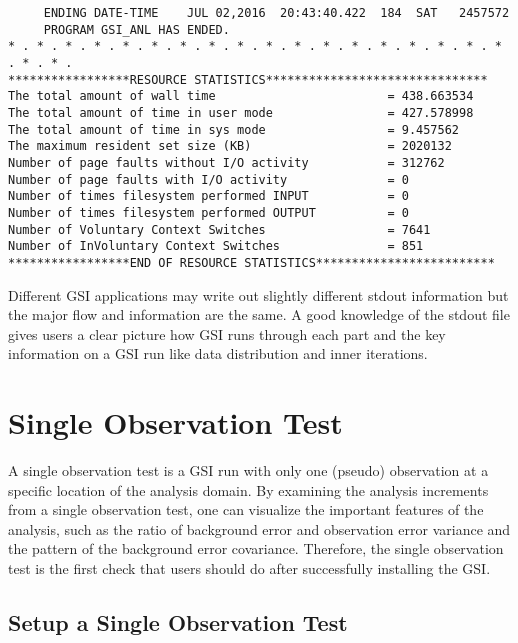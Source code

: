 \begin{scriptsize}
\begin{verbatim}
     ENDING DATE-TIME    JUL 02,2016  20:43:40.422  184  SAT   2457572
     PROGRAM GSI_ANL HAS ENDED.
* . * . * . * . * . * . * . * . * . * . * . * . * . * . * . * . * . * . * . * .
*****************RESOURCE STATISTICS*******************************
The total amount of wall time                        = 438.663534
The total amount of time in user mode                = 427.578998
The total amount of time in sys mode                 = 9.457562
The maximum resident set size (KB)                   = 2020132
Number of page faults without I/O activity           = 312762
Number of page faults with I/O activity              = 0
Number of times filesystem performed INPUT           = 0
Number of times filesystem performed OUTPUT          = 0
Number of Voluntary Context Switches                 = 7641
Number of InVoluntary Context Switches               = 851
*****************END OF RESOURCE STATISTICS*************************
\end{verbatim}
\end{scriptsize}

Different GSI applications may write out slightly different stdout information but the major flow and information are the same. A good knowledge of the stdout file gives users a clear picture how GSI runs through each part and the key information on a GSI run like data distribution and inner iterations.


\section{Single Observation Test}
\label{sec4.2}

A single observation test is a GSI run with only one (pseudo) observation at a specific location of the analysis domain. By examining the analysis increments from a single observation test, one can visualize the important features of the analysis, such as the ratio of background error and observation error variance and the pattern of the background error covariance. Therefore, the single observation test is the first check that users should do after successfully installing the GSI.

\subsection{Setup a Single Observation Test}

